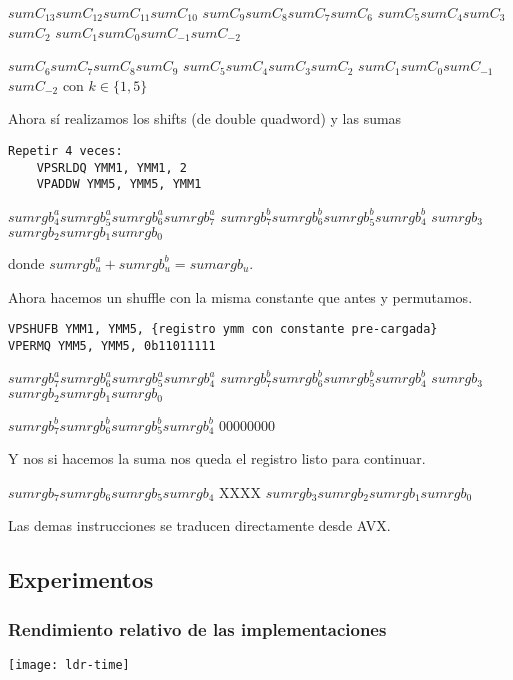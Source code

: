  \ymmWord
{$sumC_{13}$}{$sumC_{12}$}{$sumC_{11}$}{$sumC_{10}$}
{$sumC_9$}{$sumC_8$}{$sumC_7$}{$sumC_6$}
{$sumC_5$}{$sumC_4$}{$sumC_3$}{$sumC_2$}
{$sumC_1$}{$sumC_0$}{$sumC_{-1}$}{$sumC_{-2}$}

 
{$sumC_6$}{$sumC_7$}{$sumC_8$}{$sumC_9$}
{$sumC_5$}{$sumC_4$}{$sumC_3$}{$sumC_2$}
{$sumC_1$}{$sumC_0$}{$sumC_{-1}$}{$sumC_{-2}$}
con $k \in \{1,5\}$

Ahora sí realizamos los shifts (de double quadword) y las sumas

\begin{lstlisting}
Repetir 4 veces:
    VPSRLDQ YMM1, YMM1, 2
    VPADDW YMM5, YMM5, YMM1
\end{lstlisting}

 
{$sumrgb^a_4$}{$sumrgb^a_5$}{$sumrgb^a_6$}{$sumrgb^a_7$}
{$sumrgb^b_7$}{$sumrgb^b_6$}{$sumrgb^b_5$}{$sumrgb^b_4$}
{$sumrgb_3$}{$sumrgb_2$}{$sumrgb_1$}{$sumrgb_0$}

donde $sumrgb^a_u + sumrgb^b_u = sumargb_u$.

Ahora hacemos un shuffle con la misma constante que antes y permutamos.

\begin{lstlisting}
VPSHUFB YMM1, YMM5, {registro ymm con constante pre-cargada}
VPERMQ YMM5, YMM5, 0b11011111
\end{lstlisting}

 
{$sumrgb^a_7$}{$sumrgb^a_6$}{$sumrgb^a_5$}{$sumrgb^a_4$}
{$sumrgb^b_7$}{$sumrgb^b_6$}{$sumrgb^b_5$}{$sumrgb^b_4$}
{$sumrgb_3$}{$sumrgb_2$}{$sumrgb_1$}{$sumrgb_0$}

 
{$sumrgb^b_7$}{$sumrgb^b_6$}{$sumrgb^b_5$}{$sumrgb^b_4$}
{0}{0}{0}{0}{0}{0}{0}{0}

Y nos si hacemos la suma nos queda el registro listo para continuar.

 
{$sumrgb_7$}{$sumrgb_6$}{$sumrgb_5$}{$sumrgb_4$}
{X}{X}{X}{X}
{$sumrgb_3$}{$sumrgb_2$}{$sumrgb_1$}{$sumrgb_0$}

Las demas instrucciones se traducen directamente desde AVX.

\subsection{Experimentos}

\subsubsection{Rendimiento relativo de las implementaciones}

\texttt{[image: ldr-time]}

